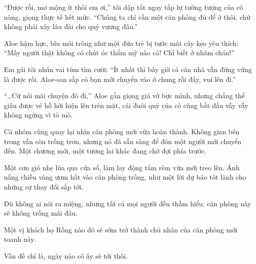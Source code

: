 \documentclass[../main.tex]{subfiles}
\begin{document}
``Được rồi, mơ mộng ít thôi em ơi,'' tôi dập tắt ngay tắp lự tưởng tượng của cô nàng, giọng thực tế hết mức. ``Chúng ta chỉ cần một căn phòng đủ để ở thôi, chứ không phải xây lâu đài cho quỷ vương đâu.''

Aloe hậm hực, bĩu môi trông như một đứa trẻ bị tước mất cây kẹo yêu thích: ``Mấy người thật không có chút óc thẩm mỹ nào cả! Chỉ biết ở nhàm chán!''

Em gái tôi nhún vai tủm tỉm cười: ``Ít nhất thì bây giờ cả căn nhà vẫn đứng vững là được rồi. Aloe-san sắp có bạn mới chuyển vào ở chung rồi đấy, vui lên đi.''

``\dots Cứ nói mãi chuyện đó đi,'' Aloe gằn giọng giả vờ bực mình, nhưng chẳng thể giấu được vẻ hồ hởi hiện lên trên mặt, cái đuôi quỷ của cô cũng bắt đầu vẫy vẫy không ngừng vì tò mò.

Cả nhóm cùng quay lại nhìn căn phòng mới vừa hoàn thành. Không gian bên trong vẫn còn trống trơn, nhưng nó đã sẵn sàng để đón một người mới chuyển đến. Một chương mới, một tương lai khác đang chờ đợi phía trước.

Một cơn gió nhẹ lùa qua cửa sổ, làm lay động tấm rèm vừa mới treo lên. Ánh nắng chiều vàng ươm hắt vào căn phòng trống, như một lời dự báo tốt lành cho những sự thay đổi sắp tới.

Dù không ai nói ra miệng, nhưng tất cả mọi người đều thầm hiểu: căn phòng này sẽ không trống mãi đâu.

Một vị khách họ Rồng nào đó sẽ sớm trở thành chủ nhân của căn phòng mới toanh này.

Vấn đề chỉ là, ngày nào cô ấy sẽ tới thôi.
\end{document}

